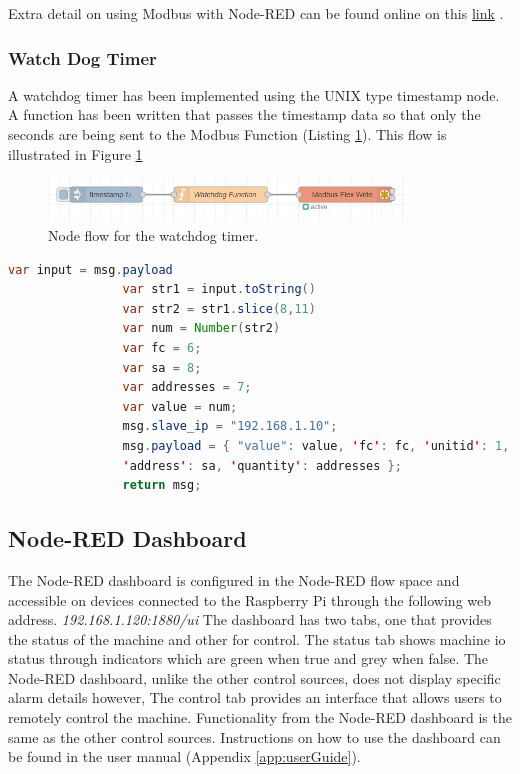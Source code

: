             
            Extra detail on using Modbus with Node-RED can be found online on this \href{https://stevesnoderedguide.com/node-red-modbus}{link} \cite{modbusNodeRed}.
            
        \subsubsection{Watch Dog Timer}
            A watchdog timer has been implemented using the UNIX type timestamp node. A function has been written that passes the timestamp data so that only the seconds are being sent to the Modbus Function (Listing \ref{fig:nodeRedWatchDogFlow}). This flow is illustrated in Figure \ref{fig:nodeRedWatchDogFlow}

            \begin{figure}[H]
                    \centering
                    \includegraphics[width = 0.85\textwidth]{2_images/nodeRedWatchDogFlow}
                    \caption{Node flow for the watchdog timer.}
                    \label{fig:nodeRedWatchDogFlow}
            \end{figure}  


            \begin{lstlisting}[language=Java, caption=Watchdog timer script, label=list:watchDog]
                var input = msg.payload
                var str1 = input.toString()
                var str2 = str1.slice(8,11)
                var num = Number(str2)
                var fc = 6;
                var sa = 8;
                var addresses = 7;
                var value = num;
                msg.slave_ip = "192.168.1.10";
                msg.payload = { "value": value, 'fc': fc, 'unitid': 1, 
                'address': sa, 'quantity': addresses };
                return msg;
            \end{lstlisting}            

    \subsection{Node-RED Dashboard}
        The Node-RED dashboard is configured in the Node-RED flow space and accessible on devices connected to the Raspberry Pi through the following web address. \newline \textit{192.168.1.120:1880/ui} \newline The dashboard has two tabs, one that provides the status of the machine and other for control. The status tab shows machine \acrshort{io} status through indicators which are green when true and grey when false. The Node-RED dashboard, unlike the other control sources, does not display specific alarm details however, 
        The control tab provides an interface that allows users to remotely control the machine. Functionality from the Node-RED dashboard is the same as the other control sources. Instructions on how to use the dashboard can be found in the user manual (Appendix \ref{app:userGuide}).

